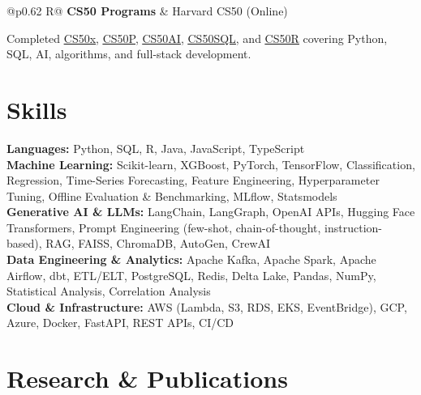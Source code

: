 \documentclass[a4paper,10pt]{article}
\newcommand{\ulink}[2]{\href{#1}{\uline{#2}}}
\newcommand{\subheading}[1]{{\color[HTML]{0A0A0A}\fontsize{12}{14}\selectfont\bfseries #1}}
\newcommand{\meta}[1]{{\color[HTML]{5C5C5C}\fontsize{10.5}{12.5}\selectfont #1}}
\begin{document}
\begin{tabularx}{\linewidth}{@{}p{0.62\linewidth} R@{}}
\subheading{CS50 Programs} & \meta{Harvard CS50 (Online)}
\end{tabularx}
\vspace{2pt}
{\color[HTML]{3A3A3A}\fontsize{11}{14}\selectfont Completed \ulink{https://cs50.harvard.edu/certificates/b14b78df-e05c-413e-a607-1dd27303053a}{CS50x}, \ulink{https://cs50.harvard.edu/certificates/32477052-9db4-49c4-a5a4-d7e58429ca2c}{CS50P}, \ulink{https://cs50.harvard.edu/certificates/9cdb4d4a-1250-4f8e-9fd7-191864e0f919}{CS50AI}, \ulink{https://cs50.harvard.edu/certificates/bc486f24-f085-4e61-8536-80940b97a1b9}{CS50SQL}, and \ulink{https://cs50.harvard.edu/certificates/666838e6-a053-4d82-b179-a60fe745fd84}{CS50R} covering Python, SQL, AI, algorithms, and full-stack development.}

\vspace{2pt}

\section{Skills}
\vspace{2pt}
{\color[HTML]{0A0A0A}\fontsize{11}{14}\selectfont
\textbf{Languages:} Python, SQL, R, Java, JavaScript, TypeScript \\[2pt]
\textbf{Machine Learning:} Scikit-learn, XGBoost, PyTorch, TensorFlow, Classification, Regression, Time-Series Forecasting, Feature Engineering, Hyperparameter Tuning, Offline Evaluation \& Benchmarking, MLflow, Statsmodels \\[2pt]
\textbf{Generative AI \& LLMs:} LangChain, LangGraph, OpenAI APIs, Hugging Face Transformers, Prompt Engineering (few-shot, chain-of-thought, instruction-based), RAG, FAISS, ChromaDB, AutoGen, CrewAI \\[2pt]
\textbf{Data Engineering \& Analytics:} Apache Kafka, Apache Spark, Apache Airflow, dbt, ETL/ELT, PostgreSQL, Redis, Delta Lake, Pandas, NumPy, Statistical Analysis, Correlation Analysis \\[2pt]
\textbf{Cloud \& Infrastructure:} AWS (Lambda, S3, RDS, EKS, EventBridge), GCP, Azure, Docker, FastAPI, REST APIs, CI/CD}

\vspace{2pt}

\section{Research \& Publications}
\vspace{2pt}
\end{document}
